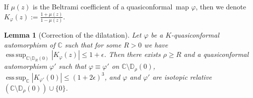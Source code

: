 \documentclass[10pt,reqno,a4paper]{amsart}
\numberwithin{figure}{section}
\numberwithin{equation}{section}
\newtheorem{lmm}[thm]{Lemma}
\newcommand{\qc}{quasiconformal}
\DeclareMathOperator*{\esssup}{ess\,sup}
\begin{document}
If $\mu(z)$ is the Beltrami coefficient of a \qc\ map $\varphi$, then we denote $K_\varphi(z):=\frac{1+\mu(z)}{1-\mu(z)}$.

\begin{lmm}[Correction of the dilatation]
	\label{lmm:correction_of_dilatation}
	Let $ \varphi $ be a $ K $-quasiconformal automorphism of $ \mathbb{C} $ such that for some $R>0$ we have $\esssup_{\mathbb{C} \setminus \mathbb{D}_R(0)}|K_\varphi(z)| \leq 1+\epsilon$. Then there exists $\rho\geq R$ and a quasiconformal automorphism $ \varphi' $  such that $ \varphi\equiv\varphi' $ on $\mathbb{C}\setminus\mathbb{D}_{\rho}(0)$, $\esssup_{\mathbb{C}}|K_{\varphi'}(0)| \leq (1+2\epsilon)^3$, and $ \varphi $ and $ \varphi' $ are isotopic relative $ (\mathbb{C}\setminus\mathbb{D}_\rho(0)) \cup \{0\} $.
\end{lmm}
\end{document}
